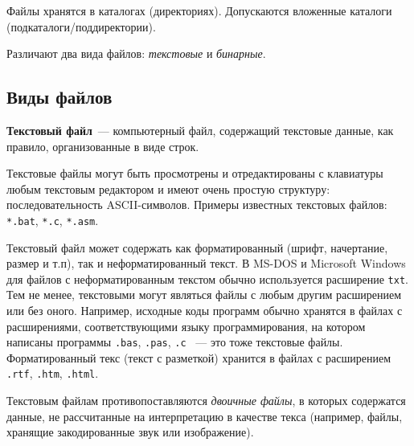 
Файлы хранятся в каталогах (директориях). Допускаются вложенные каталоги (подкаталоги/поддиректории).

Различают два вида файлов: \textit{текстовые} и \textit{бинарные}.

\subsection{Виды файлов}
\textbf{Текстовый файл}~--- компьютерный файл, содержащий текстовые данные, как правило, организованные в виде строк.

Текстовые файлы могут быть просмотрены и отредактированы с клавиатуры любым текстовым редактором и имеют очень простую структуру: последовательность ASCII-символов. Примеры 
известных текстовых файлов: \verb|*.bat|, \verb|*.c|, \verb|*.asm|.

Текстовый файл может содержать как форматированный (шрифт, начертание, размер и т.п), так и неформатированный текст. В MS-DOS и Microsoft Windows для файлов с 
неформатированным текстом обычно используется расширение \verb|txt|. Тем не менее, текстовыми могут являться файлы с любым другим расширением или без оного. Например, 
исходные коды программ обычно хранятся в файлах с расширениями, соответствующими языку программирования, на котором написаны программы \verb|.bas|, \verb|.pas|, \verb|.c|
~--- это тоже текстовые файлы. Форматированный текс (текст с разметкой) хранится в файлах с расширением \verb|.rtf|, \verb|.htm|, \verb|.html|.

Текстовым файлам противопоставляются \textit{двоичные файлы}, в которых содержатся данные, не рассчитанные на интерпретацию в качестве текса
(например, файлы, хранящие закодированные звук или изображение).

